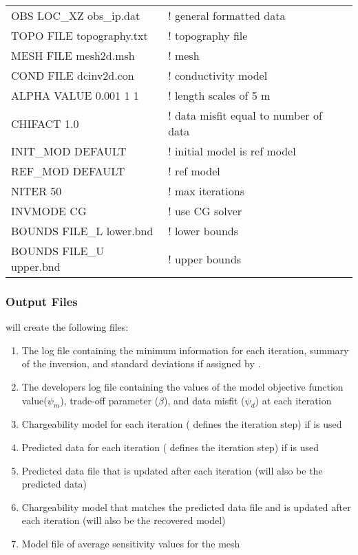\begin{fileExample}
\begin{tabular}{|ll|}
\hline
OBS LOC\_XZ obs\_ip.dat & ! general formatted data \\
TOPO FILE topography.txt & ! topography file\\
MESH FILE mesh2d.msh & !  mesh \\
COND FILE dcinv2d.con & ! conductivity model \\
ALPHA VALUE 0.001 1 1 & ! length scales of 5 m \\
CHIFACT 1.0 & ! data misfit equal to number of data \\
INIT\_MOD DEFAULT & ! initial model is ref model \\
REF\_MOD DEFAULT & ! ref model \\ 
NITER 50 & ! max iterations \\
INVMODE CG & ! use CG solver \\
BOUNDS FILE\_L lower.bnd & ! lower bounds \\
BOUNDS FILE\_U upper.bnd & ! upper bounds \\
\hline
\end{tabular}
\end{fileExample}

\subsubsection{Output Files}
 will create the following files:
\begin{enumerate}
\item {} The log file containing the minimum information for each iteration, summary of the inversion, and standard deviations if assigned by .
\item {} The developers log file containing the values of the model objective function value($\psi_m$), trade-off parameter ($\beta$), and data misfit ($\psi_d$) at each iteration 
\item {} Chargeability model for each iteration ( defines the iteration step) if  is used
\item {}  Predicted data for each iteration ( defines the iteration step) if  is used
\item {} Predicted data file that is updated after each iteration (will also be the  predicted data)
\item {} Chargeability model that matches the predicted data file and is updated after each iteration (will also be the  recovered model)
\item {} Model file of average sensitivity values for the mesh
\end{enumerate}
